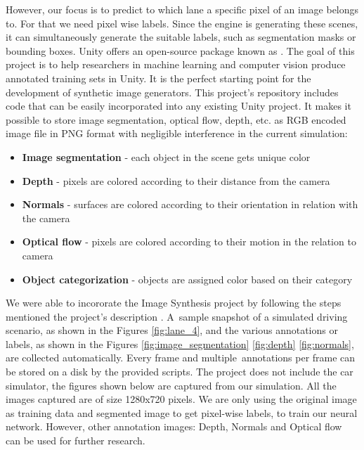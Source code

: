 However, our focus is to predict to which lane a specific pixel of an image belongs to. For that we need pixel wise labels. Since the engine is generating these scenes, it can simultaneously generate the suitable labels, such as segmentation masks or bounding boxes. Unity offers an open-source package known as  \cite{unity_image_synthesis}. The goal of this project is to help researchers in machine learning and computer vision produce annotated training sets in Unity. It is the perfect starting point for the development of synthetic image generators. This project's repository includes code that can be easily incorporated into any existing Unity project. It makes it possible to store image segmentation, optical flow, depth, etc. as RGB encoded image file in PNG format with negligible interference in the current simulation:
\begin{itemize}
  \item \textbf{Image segmentation} - each object in the scene gets unique color
  \item \textbf{Depth} - pixels are colored according to their distance from the camera
  \item \textbf{Normals} - surfaces are colored according to their orientation in relation with the camera
  \item \textbf{Optical flow} - pixels are colored according to their motion in the relation to camera
  \item \textbf{Object categorization} - objects are assigned color based on their category
\end{itemize}
We were able to incororate the Image Synthesis project by following the steps mentioned the project's description \cite{unity_image_synthesis_description}. A sample snapshot of a simulated driving scenario, as shown in the Figures \ref{fig:lane_4}, and the various annotations or labels, as shown in the Figures \ref{fig:image_segmentation} \ref{fig:depth} \ref{fig:normals}, are collected automatically. Every frame and multiple annotations per frame can be stored on a disk by the provided scripts. The project does not include the car simulator, the figures shown below are captured from our simulation. All the images captured are of size 1280x720 pixels. We are only using the original image as training data and segmented image to get pixel-wise labels, to train our neural network. However, other annotation images: Depth, Normals and Optical flow can be used for further research.

